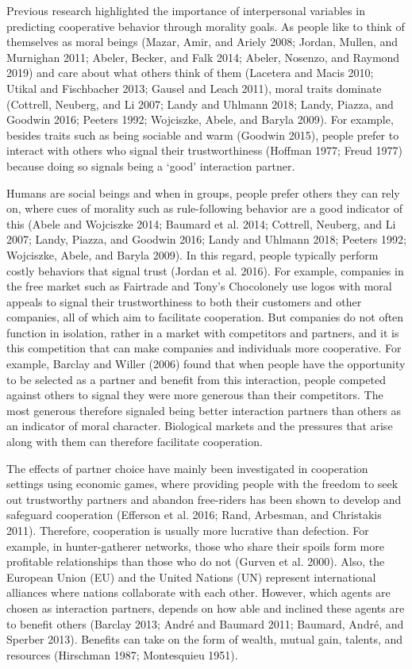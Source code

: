 \documentclass[man]{apa6}
\begin{document}
Previous research highlighted the importance of interpersonal variables
in predicting cooperative behavior through morality goals. As people
like to think of themselves as moral beings (Mazar, Amir, and Ariely
2008; Jordan, Mullen, and Murnighan 2011; Abeler, Becker, and Falk 2014;
Abeler, Nosenzo, and Raymond 2019) and care about what others think of
them (Lacetera and Macis 2010; Utikal and Fischbacher 2013; Gausel and
Leach 2011), moral traits dominate (Cottrell, Neuberg, and Li 2007;
Landy and Uhlmann 2018; Landy, Piazza, and Goodwin 2016; Peeters 1992;
Wojciszke, Abele, and Baryla 2009). For example, besides traits such as
being sociable and warm (Goodwin 2015), people prefer to interact with
others who signal their trustworthiness (Hoffman 1977; Freud 1977)
because doing so signals being a `good' interaction partner.

Humans are social beings and when in groups, people prefer others they
can rely on, where cues of morality such as rule-following behavior are
a good indicator of this (Abele and Wojciszke 2014; Baumard et al. 2014;
Cottrell, Neuberg, and Li 2007; Landy, Piazza, and Goodwin 2016; Landy
and Uhlmann 2018; Peeters 1992; Wojciszke, Abele, and Baryla 2009). In
this regard, people typically perform costly behaviors that signal trust
(Jordan et al. 2016). For example, companies in the free market such as
Fairtrade and Tony's Chocolonely use logos with moral appeals to signal
their trustworthiness to both their customers and other companies, all
of which aim to facilitate cooperation. But companies do not often
function in isolation, rather in a market with competitors and partners,
and it is this competition that can make companies and individuals more
cooperative. For example, Barclay and Willer (2006) found that when
people have the opportunity to be selected as a partner and benefit from
this interaction, people competed against others to signal they were
more generous than their competitors. The most generous therefore
signaled being better interaction partners than others as an indicator
of moral character. Biological markets and the pressures that arise
along with them can therefore facilitate cooperation.

The effects of partner choice have mainly been investigated in
cooperation settings using economic games, where providing people with
the freedom to seek out trustworthy partners and abandon free-riders has
been shown to develop and safeguard cooperation (Efferson et al. 2016;
Rand, Arbesman, and Christakis 2011). Therefore, cooperation is usually
more lucrative than defection. For example, in hunter-gatherer networks,
those who share their spoils form more profitable relationships than
those who do not (Gurven et al. 2000). Also, the European Union (EU) and
the United Nations (UN) represent international alliances where nations
collaborate with each other. However, which agents are chosen as
interaction partners, depends on how able and inclined these agents are
to benefit others (Barclay 2013; André and Baumard 2011; Baumard, André,
and Sperber 2013). Benefits can take on the form of wealth, mutual gain,
talents, and resources (Hirschman 1987; Montesquieu 1951).
\end{document}

